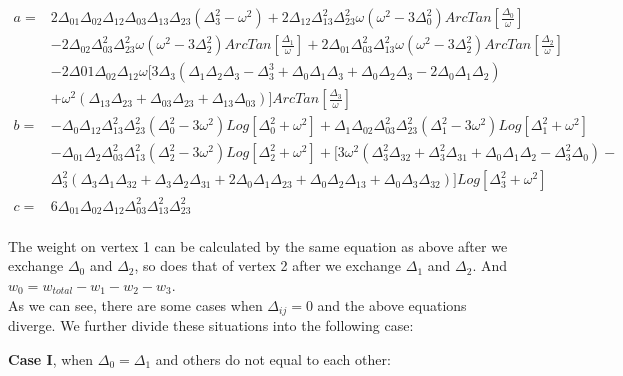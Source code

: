 \documentclass[10pt]{article}
\begin{document}
\begin{subequations}\label{wtti1az}
\begin{align}
a=&2\Delta_{01}\Delta_{02}\Delta_{12}\Delta_{03}\Delta_{13}\Delta_{23}(\Delta_{3}^2-\omega^2) +2\Delta_{12}\Delta_{13}^2\Delta_{23}^2\omega(\omega^2-3\Delta_0^2)ArcTan[\frac{\Delta_0}{\omega}]\nonumber\\ &-2\Delta_{02}\Delta_{03}^2\Delta_{23}^2\omega(\omega^2-3\Delta_2^2) ArcTan[\frac{\Delta_1}{\omega}]+2\Delta_{01}\Delta_{03}^2\Delta_{13}^2\omega(\omega^2-3\Delta_2^2)ArcTan[\frac{\Delta_2}{\omega}]\nonumber\\&-2\Delta{01}\Delta_{02}\Delta_{12}\omega[3\Delta_3(\Delta_1\Delta_2\Delta_3-\Delta_3^3+\Delta_0\Delta_1\Delta_3+\Delta_0\Delta_2\Delta_3-2\Delta_0\Delta_1\Delta_2)\nonumber\\&+\omega^2(\Delta_{13}\Delta_{23}+\Delta_{03}\Delta_{23}+\Delta_{13}\Delta_{03})]ArcTan[\frac{\Delta_3}{\omega}]\\
b=&-\Delta_{0}\Delta_{12}\Delta_{13}^2\Delta_{23}^2(\Delta_0^2-3\omega^2)Log[\Delta_0^2+\omega^2]+\Delta_{1}\Delta_{02}\Delta_{03}^2\Delta_{23}^2(\Delta_1^2-3\omega^2)Log[\Delta_1^2+\omega^2]\nonumber\\&-\Delta_{01}\Delta_{2}\Delta_{03}^2\Delta_{13}^2(\Delta_2^2-3\omega^2)Log[\Delta_2^2+\omega^2]+[3\omega^2(\Delta_3^2\Delta_{32}+\Delta_3^2\Delta_{31}+\Delta_0\Delta_1\Delta_2-\Delta_3^2\Delta_0)-\nonumber\\&\Delta_3^2(\Delta_3\Delta_1\Delta_{32}+\Delta_3\Delta_2\Delta_{31}+2\Delta_0\Delta_1\Delta_{23}+\Delta_0\Delta_2\Delta_{13}+\Delta_0\Delta_3\Delta_{32})]Log[\Delta_3^2+\omega^2]\\
c=&6\Delta_{01}\Delta_{02}\Delta_{12}\Delta_{03}^2\Delta_{13}^2\Delta_{23}^2
\end{align}
\end{subequations}\\

The weight on vertex 1 can be calculated by the same equation as above after we exchange $\Delta_0$ and $\Delta_2$, so does that of vertex 2 after we exchange $\Delta_1$ and $\Delta_2$. And $w_0=w_{total}-w_1-w_2-w_3$.\\

As we can see, there are some cases when $\Delta_{ij}=0$ and the above equations diverge. We further divide these situations into the following case:

\textbf{Case I}, when $\Delta_0=\Delta_1$ and others do not equal to each other:\\
\end{document}
